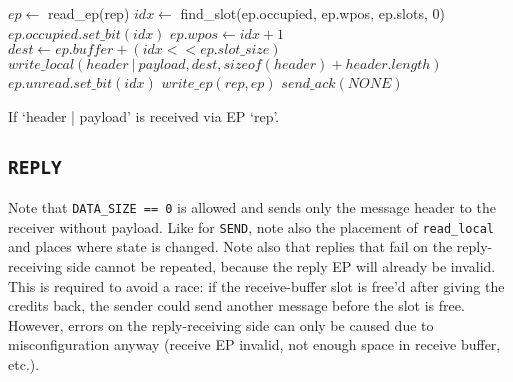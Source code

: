 \begin{algorithm}[H]
    $ep \gets$ read\_ep(rep)\;
    \BlankLine
    $idx \gets$ find\_slot(ep.occupied, ep.wpos, ep.slots, 0)\;
    $ep.occupied.set\_bit(idx)$\;
    $ep.wpos \gets idx + 1$\;
    \BlankLine
    $dest \gets ep.buffer + (idx << ep.slot\_size)$\;
    $write\_local(header\ |\ payload, dest, sizeof(header) + header.length)$\;
    $ep.unread.set\_bit(idx)$\;
    $write\_ep(rep, ep)$\;
    \BlankLine
    \BlankLine
    $send\_ack(NONE)$\;
    \BlankLine
    \extend{}
    \caption{If `header | payload' is received via EP `rep'.}
\end{algorithm}

\subsection{\texttt{REPLY}}

Note that \texttt{DATA\_SIZE == 0} is allowed and sends only the message header to the receiver
without payload. Like for \texttt{SEND}, note also the placement of \texttt{read\_local} and places
where state is changed. Note also that replies that fail on the reply-receiving side cannot be
repeated, because the reply EP will already be invalid. This is required to avoid a race: if the
receive-buffer slot is free'd after giving the credits back, the sender could send another message
before the slot is free. However, errors on the reply-receiving side can only be caused due to
misconfiguration anyway (receive EP invalid, not enough space in receive buffer, etc.). 

